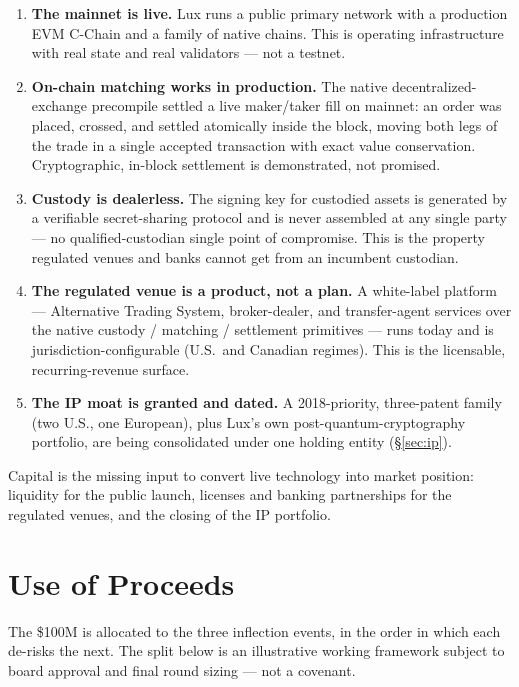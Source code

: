 \documentclass[11pt,a4paper]{article}
\begin{document}
\begin{enumerate}[leftmargin=1.6em]
  \item \textbf{The mainnet is live.} Lux runs a public primary network with
  a production EVM C-Chain and a family of native chains. This is operating
  infrastructure with real state and real validators --- not a testnet.
  \item \textbf{On-chain matching works in production.} The native
  decentralized-exchange precompile settled a live maker/taker fill on
  mainnet: an order was placed, crossed, and settled atomically inside the
  block, moving both legs of the trade in a single accepted transaction with
  exact value conservation. Cryptographic, in-block settlement is
  demonstrated, not promised.
  \item \textbf{Custody is dealerless.} The signing key for custodied assets
  is generated by a verifiable secret-sharing protocol and is never
  assembled at any single party --- no qualified-custodian single point of
  compromise. This is the property regulated venues and banks cannot get
  from an incumbent custodian.
  \item \textbf{The regulated venue is a product, not a plan.} A white-label
  platform --- Alternative Trading System, broker-dealer, and transfer-agent
  services over the native custody / matching / settlement primitives ---
  runs today and is jurisdiction-configurable (U.S.\ and Canadian regimes).
  This is the licensable, recurring-revenue surface.
  \item \textbf{The IP moat is granted and dated.} A 2018-priority,
  three-patent family (two U.S., one European), plus Lux's own
  post-quantum-cryptography portfolio, are being consolidated under one
  holding entity (\S\ref{sec:ip}).
\end{enumerate}

\noindent Capital is the missing input to convert live technology into
market position: liquidity for the public launch, licenses and banking
partnerships for the regulated venues, and the closing of the IP portfolio.

\section{Use of Proceeds}
\label{sec:use}

The \$100M is allocated to the three inflection events, in the order in
which each de-risks the next. The split below is an illustrative working
framework subject to board approval and final round sizing --- not a
covenant.
\end{document}
